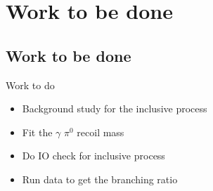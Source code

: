 \documentclass{beamer}
\begin{document}
\section{Work to be done}
\subsection{Work to be done}
\begin{frame}{Work to do}
\begin{itemize}
\item Background study for the inclusive process
\item Fit the $\gamma$ $\pi^0$ recoil mass
\item Do IO check for inclusive process
\item Run data to get the branching ratio
\end{itemize}
\end{frame}
\end{document}
